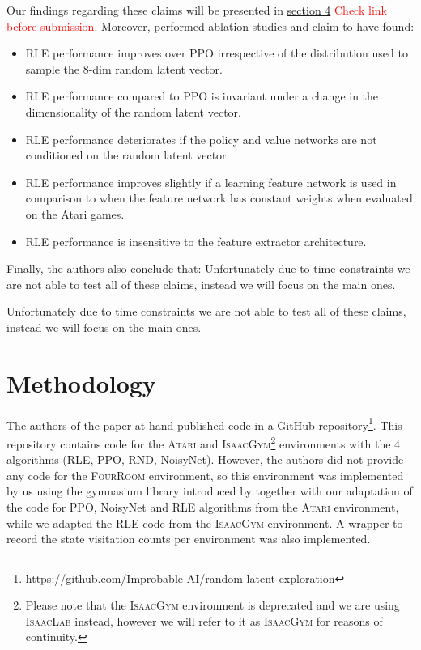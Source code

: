 \documentclass[10pt]{article} %
\begin{document}
\noindent Our findings regarding these claims will be presented in \hyperlink{sec4}{section 4} \textcolor{red}{Check link before submission}. Moreover, \cite{rle-paper} performed ablation studies and claim to have found:

\begin{itemize}
  \item RLE performance improves over PPO irrespective of the distribution used to sample the 8-dim random latent vector.
  \item RLE performance compared to PPO is invariant under a change in the dimensionality of the random latent vector.
  \item RLE performance deteriorates if the policy and value networks are not conditioned on the random latent vector.
  \item RLE performance improves slightly if a learning feature network is used in comparison to when the feature network has constant weights when evaluated on the Atari games.
  \item RLE performance is insensitive to the feature extractor architecture.
\end{itemize}

\noindent Finally, the authors also conclude that: \noindent Unfortunately due to time constraints we are not able to test all of these claims, instead we will focus on the main ones.

\noindent Unfortunately due to time constraints we are not able to test all of these claims, instead we will focus on the main ones.

\section{Methodology}

The authors of the paper at hand published code in a GitHub repository\footnote{\href{https://github.com/Improbable-AI/random-latent-exploration}{https://github.com/Improbable-AI/random-latent-exploration}}. This repository contains code for the \textsc{Atari} and \textsc{IsaacGym}\footnote{Please note that the \textsc{IsaacGym} environment is deprecated and we are using \textsc{IsaacLab} instead, however we will refer to it as \textsc{IsaacGym} for reasons of continuity.} environments with the 4 algorithms (RLE, PPO, RND, NoisyNet). However, the authors did not provide any code for the \textsc{FourRoom} environment, so this environment was implemented by us using the gymnasium library introduced by \cite{gymnasium-paper} together with our adaptation of the code for PPO, NoisyNet and RLE algorithms from the \textsc{Atari} environment, while we adapted the RLE code from the \textsc{IsaacGym} environment. A wrapper to record the state visitation counts per environment was also implemented.
\end{document}
